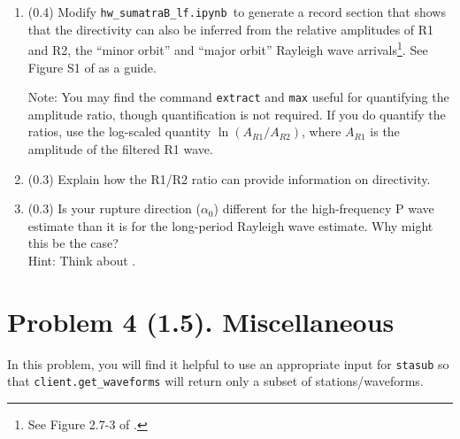 \documentclass[11pt,titlepage,fleqn]{article}
\newcommand{\tfilelf}{{\tt hw\_sumatraB\_lf.ipynb}}
\begin{document}
\begin{enumerate}
\item (0.4) Modify \tfilelf\ to generate a record section that shows that the directivity can also be inferred from the relative amplitudes of R1 and R2, the ``minor orbit'' and ``major orbit'' Rayleigh wave arrivals\footnote{See Figure 2.7-3 of \citet{SteinWysession}.}. See Figure S1 of \citet{Ammon2005} as a guide.

Note: You may find the command \verb+extract+ and \verb+max+ useful for quantifying the amplitude ratio, though quantification is not required. If you do quantify the ratios, use the log-scaled quantity $\ln(A_{R1}/A_{R2})$, where $A_{R1}$ is the amplitude of the filtered R1 wave.

\item (0.3) Explain how the R1/R2 ratio can provide information on directivity.

\item (0.3) Is your rupture direction ($\alpha_0$) different for the high-frequency P wave estimate than it is for the long-period Rayleigh wave estimate. Why might this be the case? \\
Hint: Think about .
\end{enumerate}


\section*{Problem 4 (1.5). Miscellaneous}

In this problem, you will find it helpful to use an appropriate input for \verb+stasub+ so that \verb+client.get_waveforms+ will return only a subset of stations/waveforms.
\end{document}
